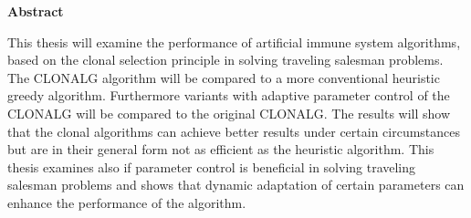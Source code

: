 %
%
% 
% 
% 



\cleardoublepage


\begin{center}
{\Large\bfseries Abstract}
\end{center}

This thesis will examine the performance of artificial immune system algorithms, based on the clonal selection principle in solving traveling salesman problems. The CLONALG algorithm will be compared to a more conventional heuristic greedy algorithm. Furthermore variants with adaptive parameter control of the CLONALG will be compared to the original CLONALG. The results will show that the clonal algorithms can achieve better results under certain circumstances but are in their general form not as efficient as the heuristic algorithm. This thesis examines also if parameter control is beneficial in solving traveling salesman problems and shows that dynamic adaptation of certain parameters can enhance the performance of the algorithm. 

